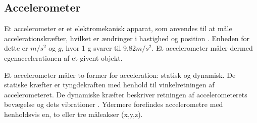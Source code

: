 \subsection{Accelerometer}
Et accelerometer er et elektromekanisk apparat, som anvendes til at måle accelerationskræfter, hvilket er ændringer i hastighed og position \citep{Goodrich2013,TittertonWeston2004}. Enheden for dette er $m/s^2$ og $g$, hvor 1 g svarer til 9,82$m/s^2$. Et accelerometer måler dermed egenaccelerationen af et givent objekt. \citep{Sparkfun,TittertonWeston2004}

Et accelerometer måler to former for acceleration: statisk og dynamisk. De statiske kræfter er tyngdekraften med henhold til vinkelretningen af accelerometeret. De dynamiske kræfter beskriver retningen af accelerometerets bevægelse og dets vibrationer \citep{Sparkfun,Goodrich2013,Engineering}. Ydermere forefindes accelerometre med henholdsvis en, to eller tre måleakser (x,y,z). \citep{TittertonWeston2004} 

